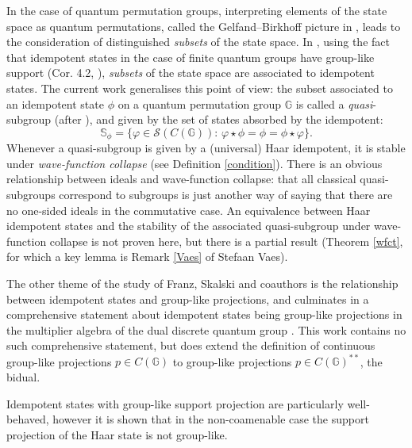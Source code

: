 \documentclass[12pt]{amsart}
\theoremstyle{remark}
\theoremstyle{remark}
\begin{document}
\bigskip

In the case of quantum permutation groups, interpreting elements of the state space as   quantum permutations, called the Gelfand--Birkhoff picture in \cite{mcc}, leads to the consideration of distinguished \emph{subsets} of the state space. In \cite{mcc}, using the fact that idempotent states in the case of finite quantum groups have group-like support (Cor. 4.2, \cite{frs}), \emph{subsets} of the state space are associated to idempotent states. The current work generalises this point of view: the subset associated to an idempotent state $\phi$  on a  quantum permutation group $\mathbb{G}$ is called a \emph{quasi}-subgroup (after \cite{kap}), and given by the set of states absorbed by the idempotent:
$$\mathbb{S}_{\phi}=\{\varphi\in\mathcal{S}(C(\mathbb{G}))\colon\,\varphi\star \phi=\phi=\phi\star \varphi\}.$$
Whenever a quasi-subgroup is given by a (universal) Haar idempotent, it is stable under \emph{wave-function collapse} (see Definition \ref{condition}). There is an obvious relationship between ideals and wave-function collapse: that  all classical quasi-subgroups correspond to subgroups  is just another way of saying that there are no one-sided ideals in the commutative case. An equivalence between Haar idempotent states and the stability of the associated quasi-subgroup under wave-function collapse is not proven here, but there is a partial result  (Theorem \ref{wfct}, for which a key lemma is Remark \ref{Vaes} of Stefaan Vaes).

\bigskip

The other theme of the study of Franz, Skalski and coauthors is the relationship between idempotent states and group-like projections, and culminates in a comprehensive statement about idempotent states being group-like projections in the multiplier algebra of the dual discrete quantum group \cite{frs}. This work contains no such comprehensive statement, but does extend the definition of continuous group-like projections $p\in C(\mathbb{G})$ to group-like projections $p\in C(\mathbb{G})^{**}$, the bidual.

\bigskip



Idempotent states with group-like support projection are particularly well-behaved, however it is shown that in the non-coamenable case the support projection of the Haar state is not group-like.



\bigskip
\end{document}

